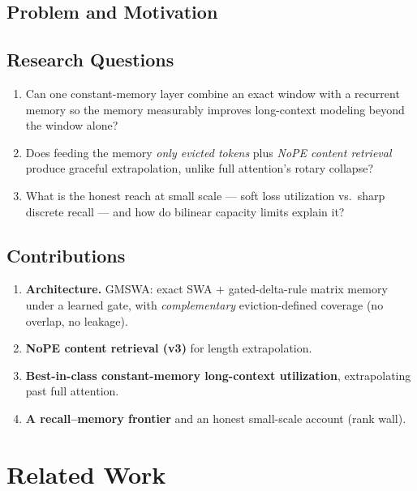 \documentclass[11pt]{article}
\begin{document}
\subsection{Problem and Motivation}

\subsection{Research Questions}
\begin{enumerate}[leftmargin=*]
  \item Can one constant-memory layer combine an exact window with a recurrent memory so the
        memory measurably improves long-context modeling beyond the window alone?
  \item Does feeding the memory \emph{only evicted tokens} plus \emph{NoPE content retrieval}
        produce graceful extrapolation, unlike full attention's rotary collapse?
  \item What is the honest reach at small scale --- soft loss utilization vs.\ sharp discrete
        recall --- and how do bilinear capacity limits explain it?
\end{enumerate}

\subsection{Contributions}
\begin{enumerate}[leftmargin=*]
  \item \textbf{Architecture.} GMSWA: exact SWA $+$ gated-delta-rule matrix memory under a
        learned gate, with \emph{complementary} eviction-defined coverage (no overlap, no leakage).
  \item \textbf{NoPE content retrieval (v3)} for length extrapolation.
  \item \textbf{Best-in-class constant-memory long-context utilization}, extrapolating past full attention.
  \item \textbf{A recall--memory frontier} and an honest small-scale account (rank wall).
\end{enumerate}

\section{Related Work}
\end{document}

